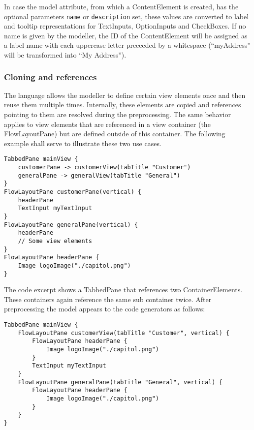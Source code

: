 In case the model attribute, from which a ContentElement is created, has the optional parameters \lstinline!name! or \lstinline!description! set, these values are converted to label and tooltip representations for TextInputs, OptionInputs and CheckBoxes. If no name is given by the modeller, the ID of the ContentElement will be assigned as a label name with each uppercase letter preceeded by a whitespace (\eg \enquote{myAddress} will be transformed into \enquote{My Address}).

\subsubsection{Cloning and references}
The \MD language allows  the modeller to define certain view elements once and then reuse them multiple times. Internally, these elements are copied and references pointing to them are resolved during the preprocessing. The same behavior applies to view elements that are referenced in a view container (\eg the FlowLayoutPane) but are defined outside of this container. The following example shall serve to illustrate these two use cases.

\begin{lstlisting}[language=MD2]
TabbedPane mainView {
	customerPane -> customerView(tabTitle "Customer")
	generalPane -> generalView(tabTitle "General")
}
FlowLayoutPane customerPane(vertical) {
	headerPane
	TextInput myTextInput
}
FlowLayoutPane generalPane(vertical) {
	headerPane
	// Some view elements
}
FlowLayoutPane headerPane {
	Image logoImage("./capitol.png")
}
\end{lstlisting}

The code excerpt shows a TabbedPane that references two ContainerElements. These containers again reference the same sub container twice. After preprocessing the model appears to the code generators as follows:

\begin{lstlisting}[language=MD2]
TabbedPane mainView {
	FlowLayoutPane customerView(tabTitle "Customer", vertical) {
		FlowLayoutPane headerPane {
			Image logoImage("./capitol.png")
	    }
		TextInput myTextInput
	}
	FlowLayoutPane generalPane(tabTitle "General", vertical) {
		FlowLayoutPane headerPane {
			Image logoImage("./capitol.png")
		}
	}
}
\end{lstlisting}

